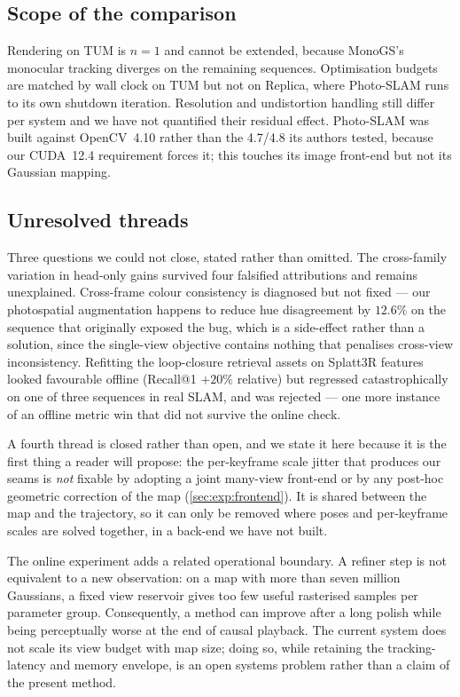 \subsection{Scope of the comparison}
Rendering on TUM is $n{=}1$ and cannot be extended, because MonoGS's monocular
tracking diverges on the remaining sequences. Optimisation budgets are matched
by wall clock on TUM but not on Replica, where Photo-SLAM runs to its own
shutdown iteration. Resolution and undistortion handling still differ per
system and we have not quantified their residual effect. Photo-SLAM was built
against OpenCV~4.10 rather than the 4.7/4.8 its authors tested, because our
CUDA~12.4 requirement forces it; this touches its image front-end but not its
Gaussian mapping.

\subsection{Unresolved threads}
Three questions we could not close, stated rather than omitted. The
cross-family variation in head-only gains survived four falsified attributions
and remains unexplained. Cross-frame colour consistency is diagnosed but not
fixed --- our photospatial augmentation happens to reduce hue disagreement by
$12.6\%$ on the sequence that originally exposed the bug, which is a
side-effect rather than a solution, since the single-view objective contains
nothing that penalises cross-view inconsistency. Refitting the loop-closure
retrieval assets on Splatt3R features looked favourable offline (Recall@1
$+20\%$ relative) but regressed catastrophically on one of three sequences in
real SLAM, and was rejected --- one more instance of an offline metric win that
did not survive the online check.

A fourth thread is closed rather than open, and we state it here because it is
the first thing a reader will propose: the per-keyframe scale jitter that
produces our seams is \emph{not} fixable by adopting a joint many-view
front-end or by any post-hoc geometric correction of the map
(\cref{sec:exp:frontend}). It is shared between the map and the trajectory,
so it can only be removed where poses and per-keyframe scales are solved
together, in a back-end we have not built.

The online experiment adds a related operational boundary. A refiner step is
not equivalent to a new observation: on a map with more than seven million
Gaussians, a fixed view reservoir gives too few useful rasterised samples per
parameter group. Consequently, a method can improve after a long polish while
being perceptually worse at the end of causal playback. The current system
does not scale its view budget with map size; doing so, while retaining the
tracking-latency and memory envelope, is an open systems problem rather than a
claim of the present method.
